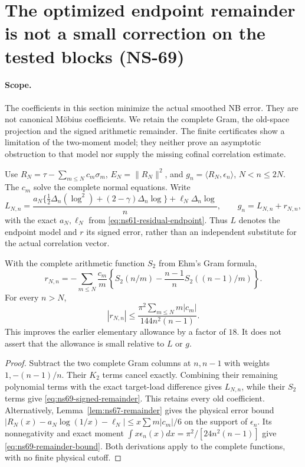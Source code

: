 \section{The optimized endpoint remainder is not a small correction on the tested blocks (NS-69)}
\label{sec:ns69-actual-remainder}

\paragraph{Scope.}
The coefficients in this section minimize the actual smoothed NB error.
They are not canonical M\"obius coefficients. We retain the complete
Gram, the old-space projection and the signed arithmetic remainder.
The finite certificates show a limitation of the two-moment model;
they neither prove an asymptotic obstruction to that model nor supply
the missing cofinal correlation estimate.

Use $R_N=\tau-\sum_{m\leq N}c_m\sigma_m$, $E_N=\|R_N\|^2$,
and $g_n=\langle R_N,\epsilon_n\rangle$, $N<n\leq2N$.
The $c_m$ solve the complete normal equations. Write
\[
 L_{N,n}=\frac{a_N\{\tfrac12\Delta_n(\log^2)
                  +(2-\gamma)\Delta_n\log\}
                   +\ell_N\Delta_n\log}{n},
 \qquad g_n=L_{N,n}+r_{N,n},
\]
with the exact $a_N,\ell_N$ from
\eqref{eq:ns61-residual-endpoint}. Thus $L$ denotes the endpoint
model and $r$ its signed error, rather than an independent substitute
for the actual correlation vector.

\begin{proposition}
\label{prop:ns69-remainder}
With the complete arithmetic function $S_2$ from Ehm's Gram formula,
\begin{equation}
 r_{N,n}=-\sum_{m\leq N}\frac{c_m}{m}
       \left\{S_2(n/m)-\frac{n-1}{n}S_2((n-1)/m)\right\}.
 \label{eq:ns69-signed-remainder}
\end{equation}
For every $n>N$,
\begin{equation}
 |r_{N,n}|\leq
 \frac{\pi^2\sum_{m\leq N}m|c_m|}{144n^2(n-1)}.
 \label{eq:ns69-remainder-bound}
\end{equation}
This improves the earlier elementary allowance by a factor of $18$.
It does not assert that the allowance is small relative to $L$ or $g$.
\end{proposition}
\begin{proof}
Subtract the two complete Gram columns at $n,n-1$ with weights
$1,-(n-1)/n$. Their $K_2$ terms cancel exactly. Combining their
remaining polynomial terms with the exact target-load difference
gives $L_{N,n}$, while their $S_2$ terms give
\eqref{eq:ns69-signed-remainder}. This retains every old coefficient.
Alternatively, Lemma~\ref{lem:ns67-remainder} gives the physical
error bound
$|R_N(x)-a_N\log(1/x)-\ell_N|\leq x\sum m|c_m|/6$
on the support of $\epsilon_n$. Its nonnegativity and exact moment
$\int x\epsilon_n(x)dx=\pi^2/[24n^2(n-1)]$ give
\eqref{eq:ns69-remainder-bound}. Both derivations apply to the
complete functions, with no finite physical cutoff.
\end{proof}

